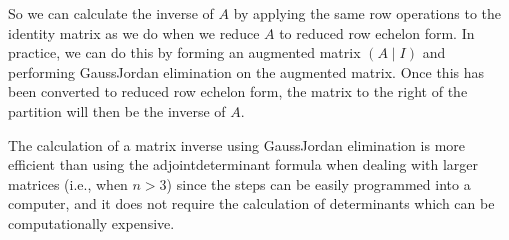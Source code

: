 \documentclass[letterpaper,10pt,english]{jupyterBook}
\begin{document}
\sphinxAtStartPar
So we can calculate the inverse of \(A\) by applying the same row operations to the identity matrix as we do when we reduce \(A\) to reduced row echelon form. In practice, we can do this by forming an augmented matrix \((A \mid I)\) and performing Gauss\sphinxhyphen{}Jordan elimination on the augmented matrix. Once this has been converted to reduced row echelon form, the matrix to the right of the partition will then be the inverse of \(A\).

\sphinxAtStartPar
The calculation of a matrix inverse using Gauss\sphinxhyphen{}Jordan elimination is more efficient than using the adjoint\sphinxhyphen{}determinant formula when dealing with larger matrices (i.e., when \(n > 3\)) since the steps can be easily programmed into a computer, and it does not require the calculation of determinants \sphinxhyphen{} which can be computationally expensive.
\end{document}
